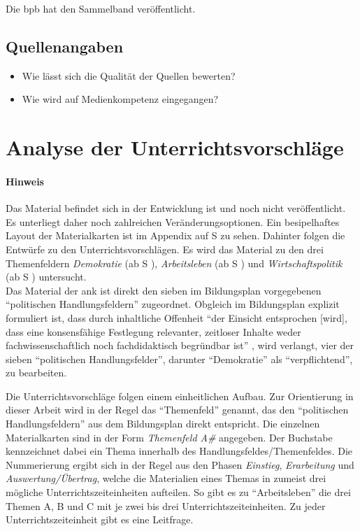 Die \gls{bpb} hat den Sammelband veröffentlicht.
\subsection{Quellenangaben}
\begin{itemize}
    \item Wie lässt sich die Qualität der Quellen bewerten?
    \item Wie wird auf Medienkompetenz eingegangen?
 \end{itemize}




\section{Analyse der Unterrichtsvorschläge \label{Analyse}}
\paragraph{Hinweis}
Das Material befindet sich in der Entwicklung ist und noch nicht veröffentlicht. Es unterliegt daher noch zahlreichen Veränderungsoptionen. 
Ein besipelhaftes Layout der Materialkarten ist im Appendix auf \acrlong{S} \pageref{ANKPrototyp} zu sehen. Dahinter folgen die Entwürfe zu den Unterrichtsvorschlägen.
Es wird das Material zu den drei Themenfeldern \emph{Demokratie} (ab \gls{S} \pageref{DEMOKRATIE-A1}), \emph{Arbeitsleben} (ab \gls{S} \pageref{ARBEITSLEBEN-A1}) und \emph{Wirtschaftspolitik} (ab \gls{S} \pageref{WIRTSCHAFTSPOLITIK-A1}) untersucht. \\


Das Material der \gls{ank} ist direkt den sieben im Bildungsplan vorgegebenen \enquote{politischen Handlungsfeldern} \autocite[3, 15]{bplan} zugeordnet.
Obgleich im Bildungsplan explizit formuliert ist, dass durch inhaltliche Offenheit \enquote{der Einsicht entsprochen [wird], dass eine konsensfähige Festlegung relevanter, zeitloser Inhalte weder fachwissenschaftlich noch fachdidaktisch begründbar ist} \autocite[15]{bplan}, wird verlangt, vier der sieben \enquote{politischen Handlungsfelder}, darunter \enquote{Demokratie} als \enquote{verpflichtend}, zu bearbeiten.

Die Unterrichtsvorschläge folgen einem einheitlichen Aufbau. Zur Orientierung in dieser Arbeit wird in der Regel das \enquote{Themenfeld} genannt, das den \enquote{politischen Handlungsfeldern} aus dem Bildungsplan direkt entspricht. 
Die einzelnen Materialkarten sind in der Form \emph{Themenfeld A\#} angegeben. 
Der Buchstabe kennzeichnet dabei ein Thema innerhalb des Handlungsfeldes/Themenfeldes.
Die Nummerierung ergibt sich in der Regel aus den Phasen \emph{Einstieg}, \emph{Erarbeitung} und \emph{Auswertung/Übertrag}, welche die Materialien eines Themas in zumeist drei mögliche Unterrichtszeiteinheiten aufteilen. So gibt es zu \enquote{Arbeitsleben} die drei Themen A, B und C mit je zwei bis drei Unterrichtszeiteinheiten.
Zu jeder Unterrichtszeiteinheit gibt es eine Leitfrage. %


